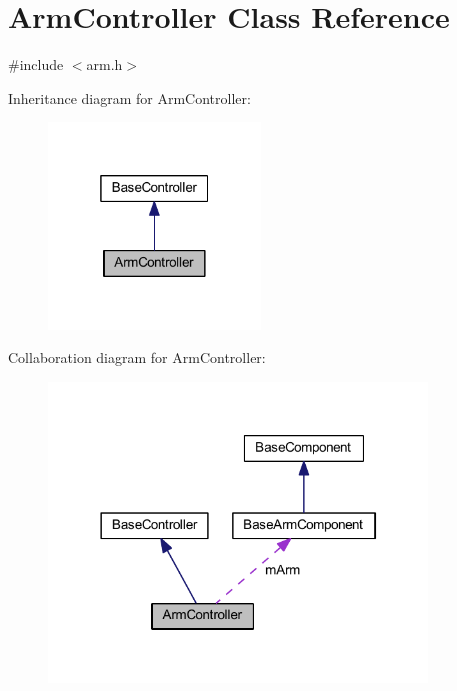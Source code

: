 \hypertarget{class_arm_controller}{\section{\-Arm\-Controller \-Class \-Reference}
\label{class_arm_controller}
}


{\ttfamily \#include $<$arm.\-h$>$}



\-Inheritance diagram for \-Arm\-Controller\-:\nopagebreak
\begin{figure}[H]
\begin{center}
\leavevmode
\includegraphics[width=160pt]{class_arm_controller__inherit__graph}
\end{center}
\end{figure}


\-Collaboration diagram for \-Arm\-Controller\-:\nopagebreak
\begin{figure}[H]
\begin{center}
\leavevmode
\includegraphics[width=285pt]{class_arm_controller__coll__graph}
\end{center}
\end{figure}
